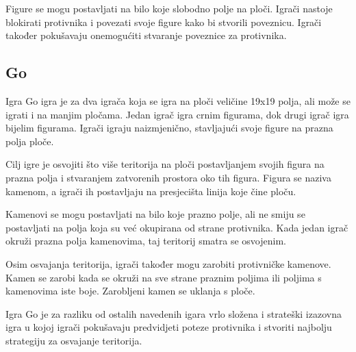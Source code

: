 Figure se mogu postavljati na bilo koje slobodno polje na ploči. Igrači nastoje blokirati protivnika i povezati svoje figure kako bi stvorili poveznicu. Igrači također pokušavaju onemogućiti stvaranje poveznice za protivnika.


\subsection*{Go}

Igra Go igra je za dva igrača koja se igra na ploči veličine 19x19 polja, ali može se igrati i na manjim pločama. Jedan igrač igra crnim figurama, dok drugi igrač igra bijelim figurama. Igrači igraju naizmjenično, stavljajući svoje figure na prazna polja ploče.

Cilj igre je osvojiti što više teritorija na ploči postavljanjem svojih figura na prazna polja i stvaranjem zatvorenih prostora oko tih figura. Figura se naziva kamenom, a igrači ih postavljaju na presjecišta linija koje čine ploču.

Kamenovi se mogu postavljati na bilo koje prazno polje, ali ne smiju se postavljati na polja koja su već okupirana od strane protivnika. Kada jedan igrač okruži prazna polja kamenovima, taj teritorij smatra se osvojenim.

Osim osvajanja teritorija, igrači također mogu zarobiti protivničke kamenove. Kamen se zarobi kada se okruži na sve strane praznim poljima ili poljima s kamenovima iste boje. Zarobljeni kamen se uklanja s ploče.

Igra Go je za razliku od ostalih navedenih igara vrlo složena i strateški izazovna igra u kojoj  igrači pokušavaju predvidjeti poteze protivnika i stvoriti najbolju strategiju za osvajanje teritorija.
